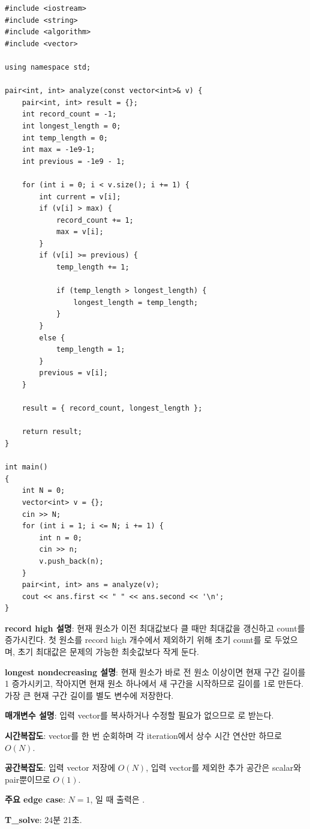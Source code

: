 \begin{answerbox}[학습자 제출 답안]
\begin{lstlisting}
#include <iostream>
#include <string>
#include <algorithm>
#include <vector>

using namespace std;

pair<int, int> analyze(const vector<int>& v) {
    pair<int, int> result = {};
    int record_count = -1;
    int longest_length = 0;
    int temp_length = 0;
    int max = -1e9-1;
    int previous = -1e9 - 1;

    for (int i = 0; i < v.size(); i += 1) {
        int current = v[i];
        if (v[i] > max) {
            record_count += 1;
            max = v[i];
        }
        if (v[i] >= previous) {
            temp_length += 1;

            if (temp_length > longest_length) {
                longest_length = temp_length;
            }
        }
        else {
            temp_length = 1;
        }
        previous = v[i];
    }

    result = { record_count, longest_length };

    return result;
}

int main()
{
    int N = 0;
    vector<int> v = {};
    cin >> N;
    for (int i = 1; i <= N; i += 1) {
        int n = 0;
        cin >> n;
        v.push_back(n);
    }
    pair<int, int> ans = analyze(v);
    cout << ans.first << " " << ans.second << '\n';
}
\end{lstlisting}

\textbf{record high 설명}: 현재 원소가 이전 최대값보다 클 때만 최대값을 갱신하고 count를 증가시킨다. 첫 원소를 record high 개수에서 제외하기 위해 초기 count를 로 두었으며, 초기 최대값은 문제의 가능한 최솟값보다 작게 둔다.

\textbf{longest nondecreasing 설명}: 현재 원소가 바로 전 원소 이상이면 현재 구간 길이를 1 증가시키고, 작아지면 현재 원소 하나에서 새 구간을 시작하므로 길이를 1로 만든다. 가장 큰 현재 구간 길이를 별도 변수에 저장한다.

\textbf{매개변수 설명}: 입력 vector를 복사하거나 수정할 필요가 없으므로 로 받는다.

\textbf{시간복잡도}: vector를 한 번 순회하며 각 iteration에서 상수 시간 연산만 하므로 $O(N)$.

\textbf{공간복잡도}: 입력 vector 저장에 $O(N)$, 입력 vector를 제외한 추가 공간은 scalar와 pair뿐이므로 $O(1)$.

\textbf{주요 edge case}: $N=1$, 일 때 출력은 .

\textbf{T\_solve}: 24분 21초.
\end{answerbox}


